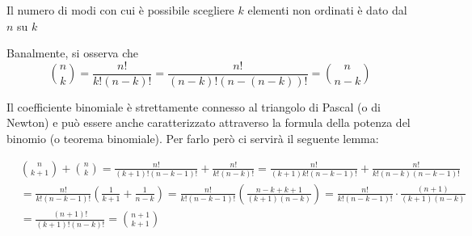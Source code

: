 \documentclass{report}
\begin{document}
Il numero di modi con cui è possibile scegliere  $k$ elementi non ordinati è dato dal  $n$ su $k$
\begin{myproof}
	Banalmente, si osserva che
	$$
		\binom{n}{k} = \frac{n!}{k!(n-k)!} = \frac{n!}{(n-k)!(n-(n-k))!} = \binom{n}{n-k}
	$$
\end{myproof}
\noindent Il coefficiente binomiale è strettamente connesso al triangolo di Pascal (o di Newton) e può essere anche caratterizzato attraverso la formula della potenza del binomio (o teorema binomiale). Per farlo però ci servirà il seguente lemma:
\begin{myproof}
	\begin{align*}
		&\binom{n}{k+1} + \binom{n}{k} = \frac{n!}{(k+1)!(n-k-1)!} + \frac{n!}{k!(n-k)!} = \frac{n!}{(k+1)k!(n-k-1)!} + \frac{n!}{k!(n-k)(n-k-1)!} \\ &= \frac{n!}{k!(n-k-1)!} \left( \frac{1}{k+1} + \frac{1}{n-k} \right) = \frac{n!}{k!(n-k-1)!} \left( \frac{n -k + k + 1}{(k+1)(n-k)} \right) = \frac{n!}{k!(n-k-1)!} \cdot \frac{(n+1)}{(k+1)(n-k)} \\ &= \frac{(n+1)!}{(k+1)!(n-k)!} = \binom{n+1}{k+1}
	\end{align*}
\end{myproof}
\end{document}
